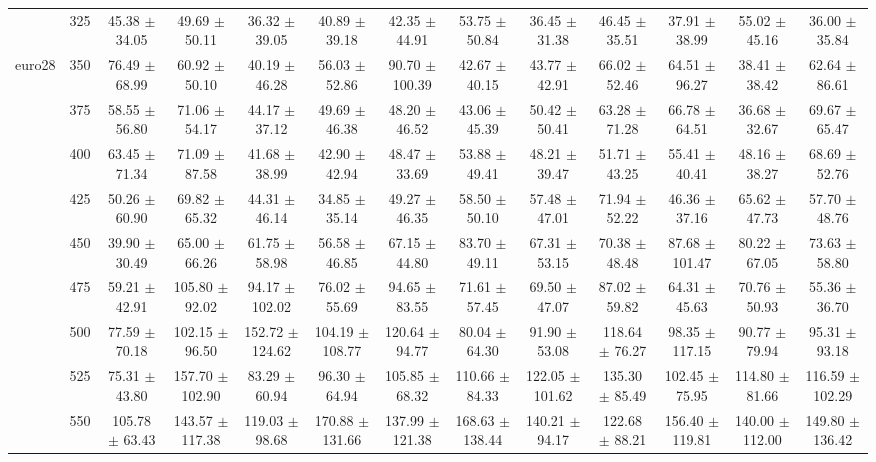 \begin{table}[h]
{\begin{tabular}{
        ccccccccccccc}
 & 325& 45.38 $\pm$ 34.05& 49.69 $\pm$ 50.11& 36.32 $\pm$ 39.05& 40.89 $\pm$ 39.18& 42.35 $\pm$ 44.91& 53.75 $\pm$ 50.84& 36.45 $\pm$ 31.38& 46.45 $\pm$ 35.51& 37.91 $\pm$ 38.99& 55.02 $\pm$ 45.16& 36.00 $\pm$ 35.84 \\ 
\multirow{4}{*}{euro28}& 350& 76.49 $\pm$ 68.99& 60.92 $\pm$ 50.10& 40.19 $\pm$ 46.28& 56.03 $\pm$ 52.86& 90.70 $\pm$ 100.39& 42.67 $\pm$ 40.15& 43.77 $\pm$ 42.91& 66.02 $\pm$ 52.46& 64.51 $\pm$ 96.27& 38.41 $\pm$ 38.42& 62.64 $\pm$ 86.61 \\ 
 & 375& 58.55 $\pm$ 56.80& 71.06 $\pm$ 54.17& 44.17 $\pm$ 37.12& 49.69 $\pm$ 46.38& 48.20 $\pm$ 46.52& 43.06 $\pm$ 45.39& 50.42 $\pm$ 50.41& 63.28 $\pm$ 71.28& 66.78 $\pm$ 64.51& 36.68 $\pm$ 32.67& 69.67 $\pm$ 65.47 \\ 
 & 400& 63.45 $\pm$ 71.34& 71.09 $\pm$ 87.58& 41.68 $\pm$ 38.99& 42.90 $\pm$ 42.94& 48.47 $\pm$ 33.69& 53.88 $\pm$ 49.41& 48.21 $\pm$ 39.47& 51.71 $\pm$ 43.25& 55.41 $\pm$ 40.41& 48.16 $\pm$ 38.27& 68.69 $\pm$ 52.76 \\ 
 & 425& 50.26 $\pm$ 60.90& 69.82 $\pm$ 65.32& 44.31 $\pm$ 46.14& 34.85 $\pm$ 35.14& 49.27 $\pm$ 46.35& 58.50 $\pm$ 50.10& 57.48 $\pm$ 47.01& 71.94 $\pm$ 52.22& 46.36 $\pm$ 37.16& 65.62 $\pm$ 47.73& 57.70 $\pm$ 48.76 \\ 
 & 450& 39.90 $\pm$ 30.49& 65.00 $\pm$ 66.26& 61.75 $\pm$ 58.98& 56.58 $\pm$ 46.85& 67.15 $\pm$ 44.80& 83.70 $\pm$ 49.11& 67.31 $\pm$ 53.15& 70.38 $\pm$ 48.48& 87.68 $\pm$ 101.47& 80.22 $\pm$ 67.05& 73.63 $\pm$ 58.80 \\ 
 & 475& 59.21 $\pm$ 42.91& 105.80 $\pm$ 92.02& 94.17 $\pm$ 102.02& 76.02 $\pm$ 55.69& 94.65 $\pm$ 83.55& 71.61 $\pm$ 57.45& 69.50 $\pm$ 47.07& 87.02 $\pm$ 59.82& 64.31 $\pm$ 45.63& 70.76 $\pm$ 50.93& 55.36 $\pm$ 36.70 \\ 
 & 500& 77.59 $\pm$ 70.18& 102.15 $\pm$ 96.50& 152.72 $\pm$ 124.62& 104.19 $\pm$ 108.77& 120.64 $\pm$ 94.77& 80.04 $\pm$ 64.30& 91.90 $\pm$ 53.08& 118.64 $\pm$ 76.27& 98.35 $\pm$ 117.15& 90.77 $\pm$ 79.94& 95.31 $\pm$ 93.18 \\ 
 & 525& 75.31 $\pm$ 43.80& 157.70 $\pm$ 102.90& 83.29 $\pm$ 60.94& 96.30 $\pm$ 64.94& 105.85 $\pm$ 68.32& 110.66 $\pm$ 84.33& 122.05 $\pm$ 101.62& 135.30 $\pm$ 85.49& 102.45 $\pm$ 75.95& 114.80 $\pm$ 81.66& 116.59 $\pm$ 102.29 \\ 
 & 550& 105.78 $\pm$ 63.43& 143.57 $\pm$ 117.38& 119.03 $\pm$ 98.68& 170.88 $\pm$ 131.66& 137.99 $\pm$ 121.38& 168.63 $\pm$ 138.44& 140.21 $\pm$ 94.17& 122.68 $\pm$ 88.21& 156.40 $\pm$ 119.81& 140.00 $\pm$ 112.00& 149.80 $\pm$ 136.42 \\ 

\end{tabular}}
\end{table}

